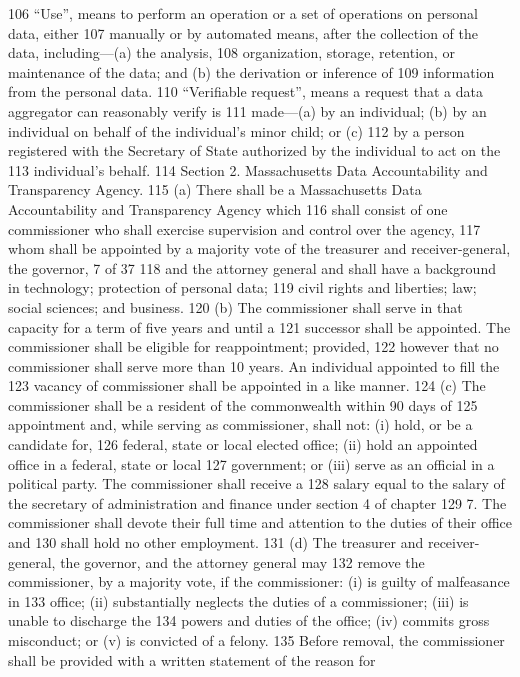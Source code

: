 106 “Use”, means to perform an operation or a set of operations on personal data, either
107 manually or by automated means, after the collection of the data, including—(a) the analysis,
108 organization, storage, retention, or maintenance of the data; and (b) the derivation or inference of
109 information from the personal data.
110 “Verifiable request”, means a request that a data aggregator can reasonably verify is
111 made—(a) by an individual; (b) by an individual on behalf of the individual’s minor child; or (c)
112 by a person registered with the Secretary of State authorized by the individual to act on the
113 individual’s behalf.
114 Section 2. Massachusetts Data Accountability and Transparency Agency.
115 (a) There shall be a Massachusetts Data Accountability and Transparency Agency which
116 shall consist of one commissioner who shall exercise supervision and control over the agency,
117 whom shall be appointed by a majority vote of the treasurer and receiver-general, the governor,
7 of 37
118 and the attorney general and shall have a background in technology; protection of personal data;
119 civil rights and liberties; law; social sciences; and business.
120 (b) The commissioner shall serve in that capacity for a term of five years and until a
121 successor shall be appointed. The commissioner shall be eligible for reappointment; provided,
122 however that no commissioner shall serve more than 10 years. An individual appointed to fill the
123 vacancy of commissioner shall be appointed in a like manner.
124 (c) The commissioner shall be a resident of the commonwealth within 90 days of
125 appointment and, while serving as commissioner, shall not: (i) hold, or be a candidate for,
126 federal, state or local elected office; (ii) hold an appointed office in a federal, state or local
127 government; or (iii) serve as an official in a political party. The commissioner shall receive a
128 salary equal to the salary of the secretary of administration and finance under section 4 of chapter
129 7. The commissioner shall devote their full time and attention to the duties of their office and
130 shall hold no other employment.
131 (d) The treasurer and receiver-general, the governor, and the attorney general may
132 remove the commissioner, by a majority vote, if the commissioner: (i) is guilty of malfeasance in
133 office; (ii) substantially neglects the duties of a commissioner; (iii) is unable to discharge the
134 powers and duties of the office; (iv) commits gross misconduct; or (v) is convicted of a felony.
135 Before removal, the commissioner shall be provided with a written statement of the reason for
